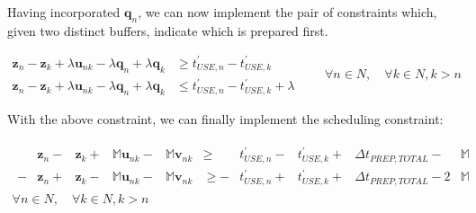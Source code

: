 Having incorporated $ \boldsymbol{q}_{n} $, we can now implement the pair of 
constraints which, given two distinct buffers, indicate which is prepared
first.

\begin{equation}
    \begin{split}
        \boldsymbol{z}_{n} - \boldsymbol{z}_{k} + \lambda \boldsymbol{u}_{nk}
        - \lambda \boldsymbol{q}_{n} + \lambda \boldsymbol{q}_{k} &\ge 
        t_{USE,n}^{\prime} - t_{USE,k}^{\prime}\\
        \boldsymbol{z}_{n} - \boldsymbol{z}_{k} + \lambda \boldsymbol{u}_{nk}
        - \lambda \boldsymbol{q}_{n} + \lambda \boldsymbol{q}_{k} &\le 
        t_{USE,n}^{\prime} - t_{USE,k}^{\prime} + \lambda
    \end{split}
    \quad \quad \forall n \in N, \quad \forall k \in N, k > n
\end{equation}

With the above constraint, we can finally implement the scheduling constraint:

\begin{equation}
    \begin{split}
        \begin{alignedat}{9}
        &\boldsymbol{z}_{n} {}-{} &\boldsymbol{z}_{k} {}+{} &\mathbb{M}
        \boldsymbol{u}_{nk} {}-{} &\mathbb{M} \boldsymbol{v}_{nk} &\ge
        &t_{USE,n}^{\prime} {}-{} &t_{USE,k}^{\prime} {}+{}
        &\Delta t_{PREP,TOTAL} {}-{} &\mathbb{M}\\
        - &\boldsymbol{z}_{n} {}+{} &\boldsymbol{z}_{k} {}-{} &\mathbb{M}
        \boldsymbol{u}_{nk} {}-{} &\mathbb{M} \boldsymbol{v}_{nk} &\ge
        - &t_{USE,n}^{\prime} {}+{} &t_{USE,k}^{\prime} {}+{}
        &\Delta t_{PREP,TOTAL} {}-{} 2 &\mathbb{M}
        \end{alignedat}
        \\\forall n \in N, \quad \forall k \in N, k > n
    \end{split}
\end{equation}


